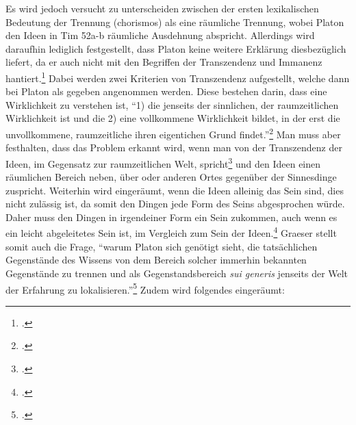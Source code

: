 Es wird jedoch versucht zu unterscheiden zwischen der ersten lexikalischen Bedeutung der Trennung (chorismos) als eine räumliche Trennung, wobei Platon den Ideen in Tim 52a-b räumliche Ausdehnung abspricht. Allerdings wird daraufhin lediglich festgestellt, dass Platon keine weitere Erklärung diesbezüglich liefert, da er auch nicht mit den Begriffen der Transzendenz und Immanenz hantiert.\footcite[vgl.][S. 34f]{DisseMetaphysik} Dabei werden zwei Kriterien von Transzendenz aufgestellt, welche dann bei Platon als gegeben angenommen werden. Diese bestehen darin, dass eine Wirklichkeit zu verstehen ist, \enquote{1) die jenseits der sinnlichen, der raumzeitlichen Wirklichkeit ist und die 2) eine vollkommene Wirklichkeit bildet, in der erst die unvollkommene, raumzeitliche ihren eigentichen Grund findet.}\footcite[][S. 35]{DisseMetaphysik} Man muss aber festhalten, dass das Problem erkannt wird, wenn man von der Transzendenz der Ideen, im Gegensatz zur raumzeitlichen Welt, spricht\footcite[vgl.][S. 35]{DisseMetaphysik} und den Ideen einen räumlichen Bereich neben, über oder anderen Ortes gegenüber der Sinnesdinge zuspricht. Weiterhin wird eingeräumt, wenn die Ideen alleinig das Sein sind, dies nicht zulässig ist, da somit den Dingen jede Form des Seins abgesprochen würde. Daher muss den Dingen in irgendeiner Form ein Sein zukommen, auch wenn es ein leicht abgeleitetes Sein ist, im Vergleich zum Sein der Ideen.\footcite[vgl.][S. 131]{Martin73}
Graeser stellt somit auch die Frage, \enquote{warum Platon sich genötigt sieht, die tatsächlichen Gegenstände des Wissens von dem Bereich solcher immerhin bekannten Gegenstände zu trennen und als Gegenstandsbereich \emph{sui generis} jenseits der Welt der Erfahrung zu lokalisieren.}\footcite[][S. 135]{GraeserPhiloGeschichte}
Zudem wird folgendes eingeräumt: 
